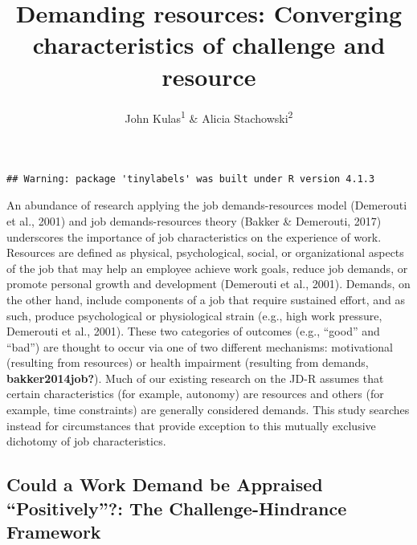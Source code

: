 \documentclass[
  man]{apa6}
\title{Demanding resources: Converging characteristics of challenge and resource}
\author{John Kulas\textsuperscript{1} \& Alicia Stachowski\textsuperscript{2}}
\date{}
\affiliation{\vspace{0.5cm}\textsuperscript{1} eRg\\\textsuperscript{2} University of Wisconsin - Stout}
\begin{document}
\maketitle

\begin{verbatim}
## Warning: package 'tinylabels' was built under R version 4.1.3
\end{verbatim}

An abundance of research applying the job demands-resources model (Demerouti et al., 2001) and job demands-resources theory (Bakker \& Demerouti, 2017) underscores the importance of job characteristics on the experience of work. Resources are defined as physical, psychological, social, or organizational aspects of the job that may help an employee achieve work goals, reduce job demands, or promote personal growth and development (Demerouti et al., 2001). Demands, on the other hand, include components of a job that require sustained effort, and as such, produce psychological or physiological strain (e.g., high work pressure, Demerouti et al., 2001). These two categories of outcomes (e.g., ``good'' and ``bad'') are thought to occur via one of two different mechanisms: motivational (resulting from resources) or health impairment (resulting from demands, \textbf{bakker2014job?}). Much of our existing research on the JD-R assumes that certain characteristics (for example, autonomy) are resources and others (for example, time constraints) are generally considered demands. This study searches instead for circumstances that provide exception to this mutually exclusive dichotomy of job characteristics.

\hypertarget{could-a-work-demand-be-appraised-positively-the-challenge-hindrance-framework}{%
\subsection{Could a Work Demand be Appraised ``Positively''?: The Challenge-Hindrance Framework}\label{could-a-work-demand-be-appraised-positively-the-challenge-hindrance-framework}}
\end{document}
